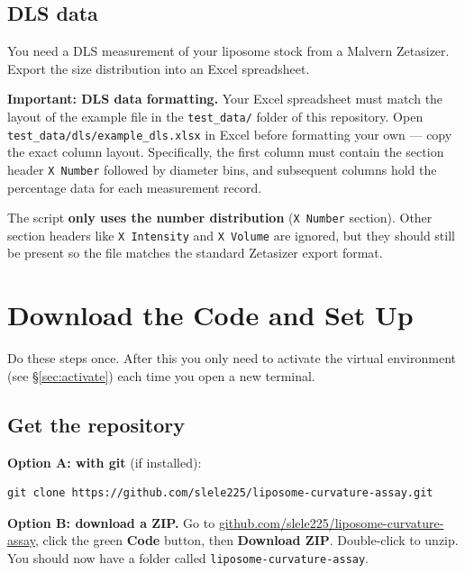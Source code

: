 \documentclass[11pt]{article}
\newcommand{\code}[1]{\texttt{#1}}
\begin{document}
\subsection{DLS data}

You need a DLS measurement of your liposome stock from a Malvern
Zetasizer. Export the size distribution into an Excel spreadsheet.

\begin{notebox}
\textbf{Important: DLS data formatting.} Your Excel spreadsheet must
match the layout of the example file in the \code{test\_data/}
folder of this repository. Open
\code{test\_data/dls/example\_dls.xlsx} in Excel before formatting
your own --- copy the exact column layout. Specifically, the first
column must contain the section header \code{X Number} followed by
diameter bins, and subsequent columns hold the percentage data for
each measurement record.

The script \textbf{only uses the number distribution} (\code{X Number}
section). Other section headers like \code{X Intensity} and
\code{X Volume} are ignored, but they should still be present so the
file matches the standard Zetasizer export format.
\end{notebox}

\section{Download the Code and Set Up}

Do these steps once. After this you only need to activate the virtual
environment (see \S\ref{sec:activate}) each time you open a new
terminal.

\subsection{Get the repository}

\textbf{Option A: with git} (if installed):

\begin{lstlisting}
git clone https://github.com/slele225/liposome-curvature-assay.git
\end{lstlisting}

\textbf{Option B: download a ZIP.} Go to
\href{https://github.com/slele225/liposome-curvature-assay}{github.com/slele225/liposome-curvature-assay},
click the green \textbf{Code} button, then \textbf{Download ZIP}.
Double-click to unzip. You should now have a folder called
\code{liposome-curvature-assay}.
\end{document}
